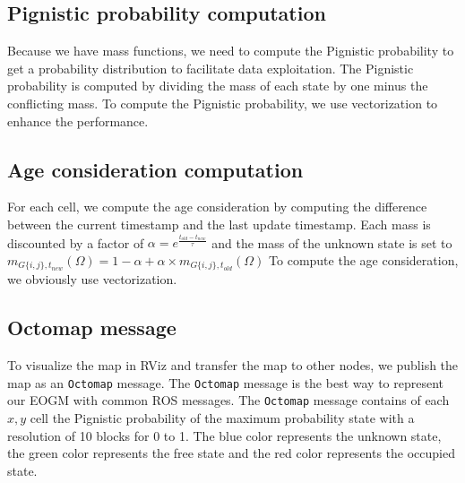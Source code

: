 \subsection{Pignistic probability computation}

Because we have mass functions, we need to compute the Pignistic probability to get a probability distribution to facilitate data exploitation.
The Pignistic probability is computed by dividing the mass of each state by one minus the conflicting mass.
To compute the Pignistic probability, we use vectorization to enhance the performance.

\subsection{Age consideration computation}

For each cell, we compute the age consideration by computing the difference between the current timestamp and the last update timestamp.
Each mass is discounted by a factor of $\alpha = e^{\frac{t_{old}-t_{new}}{\tau}} $ and the mass of the unknown state is set to $m_{G\{i, j\}, t_{new}}(\Omega) = 1 - \alpha + \alpha \times m_{G\{i, j\}, t_{old}}(\Omega)$
To compute the age consideration, we obviously use vectorization.

\subsection{Octomap message}

To visualize the map in RViz and transfer the map to other nodes, we publish the map as an \texttt{Octomap} message.
The \texttt{Octomap} message is the best way to represent our EOGM with common ROS messages. 
The \texttt{Octomap} message contains of each $x, y$ cell the Pignistic probability of the maximum probability state with a resolution of 10 blocks for 0 to 1.
The blue color represents the unknown state, the green color represents the free state and the red color represents the occupied state.

